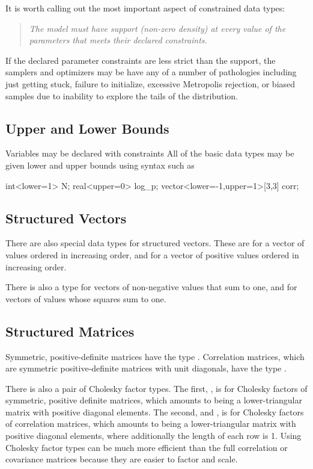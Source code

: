 It is worth calling out the most important aspect of constrained data
types: 
%
\begin{quote}
\it
The model must have support (non-zero density) at every value of the
parameters that meets their declared constraints.
\end{quote}
%
If the declared parameter constraints are less strict than the
support, the samplers and optimizers may be have any of a number of
pathologies including just getting stuck, failure to initialize,
excessive Metropolis rejection, or biased samples due to inability to
explore the tails of the distribution.

\subsection{Upper and Lower Bounds}

Variables may be declared with constraints
All of the basic data types may be given lower and upper bounds using
syntax such as
%
\begin{stancode}
int<lower=1> N;
real<upper=0> log_p;
vector<lower=-1,upper=1>[3,3] corr;
\end{stancode}

\subsection{Structured Vectors}

There are also special data types for structured vectors.  These are
 for a vector of values ordered in increasing order, and
 for a vector of positive values ordered in
increasing order.  

There is also a type  for vectors of non-negative values
that sum to one, and  for vectors of values whose
squares sum to one.

\subsection{Structured Matrices}

Symmetric, positive-definite matrices have the type
.  Correlation matrices, which are symmetric
positive-definite matrices with unit diagonals, have the type
.

There is also a pair of Cholesky factor types.  The first,
, is for Cholesky factors of symmetric,
positive definite matrices, which amounts to being a lower-triangular
matrix with positive diagonal elements.  The second, and
, is for Cholesky factors of correlation
matrices, which amounts to being a lower-triangular matrix with
positive diagonal elements, where additionally the length of each row
is 1.  Using Cholesky factor types can be much more efficient than the
full correlation or covariance matrices because they are easier to
factor and scale.



